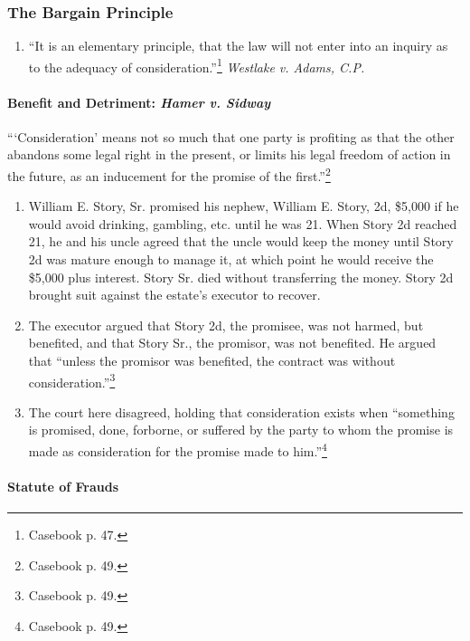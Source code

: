 \subsubsection{The Bargain Principle}

\begin{enumerate}
    \item ``It is an elementary principle, that the law will not enter into an 
    inquiry as to the adequacy of consideration.''\footnote{Casebook p. 47.} 
    \emph{Westlake v. Adams, C.P.}
\end{enumerate}
 
\paragraph{Benefit and Detriment: \emph{Hamer v. Sidway}}

\enquote{\enquote{Consideration} means not so much that one party is profiting 
as that the other abandons some legal right in the present, or limits his 
legal freedom of action in the future, as an inducement for the promise of the 
first.}\footnote{Casebook p. 49.}

\begin{enumerate}
    \item William E. Story, Sr. promised his nephew, William E. Story, 2d, 
    \$5,000 if he would avoid drinking, gambling, etc. until he was 21. When 
    Story 2d reached 21, he and his uncle agreed that the uncle would keep 
    the money until Story 2d was mature enough to manage it, at which point he 
    would receive the \$5,000 plus interest. Story Sr. died without 
    transferring the money. Story 2d brought suit against the estate's 
    executor to recover.
    \item The executor argued that Story 2d, the promisee, was not harmed, but 
    benefited, and that Story Sr., the promisor, was not benefited. He argued 
    that ``unless the promisor was benefited, the contract was without 
    consideration.''\footnote{Casebook p. 49.}
    \item The court here disagreed, holding that consideration exists when 
    ``something is promised, done, forborne, or suffered by the party to whom 
    the promise is made as consideration for the promise made to 
    him.''\footnote{Casebook p. 49.}
\end{enumerate}

\paragraph{Statute of Frauds}

